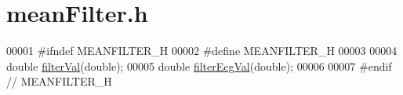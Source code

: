 \hypertarget{meanFilter_8h_source}{}\section{mean\+Filter.\+h}
\label{meanFilter_8h_source}

\begin{DoxyCode}
00001 \textcolor{preprocessor}{#ifndef MEANFILTER\_H}
00002 \textcolor{preprocessor}{#define MEANFILTER\_H}
00003 
00004 \textcolor{keywordtype}{double} \hyperlink{meanFilter_8h_ab08c7e91b48571e12575c66e10896ade}{filterVal}(\textcolor{keywordtype}{double});
00005 \textcolor{keywordtype}{double} \hyperlink{meanFilter_8h_a7a0a0543e497b3f649b43fa07c19798a}{filterEcgVal}(\textcolor{keywordtype}{double});
00006 
00007 \textcolor{preprocessor}{#endif // MEANFILTER\_H}
\end{DoxyCode}
